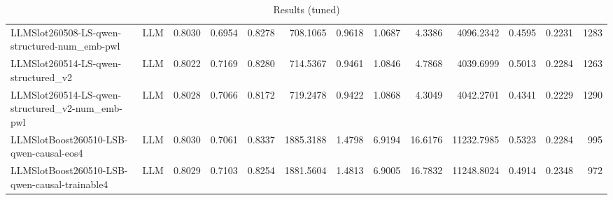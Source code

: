 \begin{table}[htbp]
{\begin{tabular}{ll|rrrrrrrrrr|r}
LLMSlot260508-LS-qwen-structured-num\_emb-pwl & LLM & 0.8030 & 0.6954 & 0.8278 & 708.1065 & 0.9618 & 1.0687 & 4.3386 & 4096.2342 & 0.4595 & 0.2231 & 1283 \\
LLMSlot260514-LS-qwen-structured\_v2 & LLM & 0.8022 & 0.7169 & 0.8280 & 714.5367 & 0.9461 & 1.0846 & 4.7868 & 4039.6999 & 0.5013 & 0.2284 & 1263 \\
LLMSlot260514-LS-qwen-structured\_v2-num\_emb-pwl & LLM & 0.8028 & 0.7066 & 0.8172 & 719.2478 & 0.9422 & 1.0868 & 4.3049 & 4042.2701 & 0.4341 & 0.2229 & 1290 \\
LLMSlotBoost260510-LSB-qwen-causal-eos4 & LLM & 0.8030 & 0.7061 & 0.8337 & 1885.3188 & 1.4798 & 6.9194 & 16.6176 & 11232.7985 & 0.5323 & 0.2284 & 995 \\
LLMSlotBoost260510-LSB-qwen-causal-trainable4 & LLM & 0.8029 & 0.7103 & 0.8254 & 1881.5604 & 1.4813 & 6.9005 & 16.7832 & 11248.8024 & 0.4914 & 0.2348 & 972 \\
\bottomrule
\end{tabular}
}
\caption{Results (tuned)}
\label{tab:results_tuned}
\end{table}